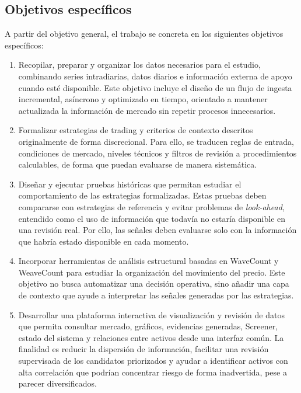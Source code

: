 \subsection{Objetivos espec\'ificos}

A partir del objetivo general, el trabajo se concreta en los siguientes
objetivos espec\'ificos:

\begin{enumerate}
    \setlength{\itemsep}{0.35em}
    \setlength{\parsep}{0pt}
    \item Recopilar, preparar y organizar los datos necesarios para el estudio,
    combinando series intradiarias, datos diarios e informaci\'on externa de
    apoyo cuando est\'e disponible. Este objetivo incluye el dise\~no de un flujo
    de ingesta incremental, as\'incrono y optimizado en tiempo, orientado a
    mantener actualizada la informaci\'on de mercado sin repetir procesos
    innecesarios.

    \item Formalizar estrategias de trading y criterios de contexto descritos
    originalmente de forma discrecional. Para ello, se traducen reglas de
    entrada, condiciones de mercado, niveles t\'ecnicos y filtros de revisi\'on a
    procedimientos calculables, de forma que puedan evaluarse de manera
    sistem\'atica.

    \item Dise\~nar y ejecutar pruebas hist\'oricas que permitan estudiar el
    comportamiento de las estrategias formalizadas. Estas pruebas deben
    compararse con estrategias de referencia y evitar problemas de
    \textit{look-ahead}, entendido como el uso de informaci\'on que todav\'ia no
    estar\'ia disponible en una revisi\'on real. Por ello, las se\~nales deben
    evaluarse solo con la informaci\'on que habr\'ia estado disponible en cada
    momento.

    \item Incorporar herramientas de an\'alisis estructural basadas en
    WaveCount y WeaveCount para estudiar la organizaci\'on del movimiento del
    precio. Este objetivo no busca automatizar una decisi\'on operativa, sino
    a\~nadir una capa de contexto que ayude a interpretar las se\~nales generadas
    por las estrategias.

    \item Desarrollar una plataforma interactiva de visualizaci\'on y revisi\'on de datos que permita
    consultar mercado, gr\'aficos, evidencias generadas, Screener, estado del
    sistema y relaciones entre activos desde una interfaz com\'un. La finalidad
    es reducir la dispersi\'on de informaci\'on, facilitar una revisi\'on
    supervisada de los candidatos priorizados y ayudar a identificar activos
    con alta correlaci\'on que podr\'ian concentrar riesgo de forma inadvertida,
    pese a parecer diversificados.


\end{enumerate}
